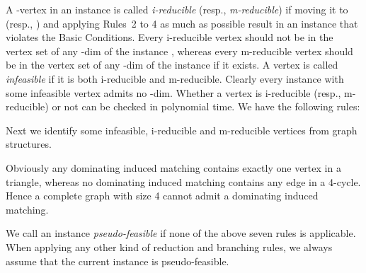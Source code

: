 \documentclass{elsart_TR2}
\begin{document}
A -vertex  in an instance  is called \emph{i-reducible} (resp., \emph{m-reducible})
if  moving it to  (resp., ) and applying Rules~2 to 4 as much as possible result in an instance that violates the Basic
Conditions.
Every i-reducible vertex should not be in the vertex set of any -dim of the instance ,
whereas every m-reducible vertex should be in the vertex set of any -dim of the instance  if it exists.
A vertex is called \emph{infeasible} if it is both i-reducible and m-reducible.
Clearly every instance with some infeasible vertex admits no -dim.
Whether a vertex is i-reducible (resp., m-reducible) or not can be checked in polynomial time. We have the following rules:



Next we identify some infeasible,   i-reducible and  m-reducible  vertices from graph structures.

Obviously any dominating induced matching contains exactly one vertex in a triangle,
whereas no dominating induced matching contains any edge in a 4-cycle.
Hence a complete graph with size 4 cannot admit a dominating induced matching.






We call an instance  {\em pseudo-feasible} if none of the above  seven rules is applicable.
When applying any other kind of reduction and branching rules, we always assume that the current instance is pseudo-feasible.
\end{document}
